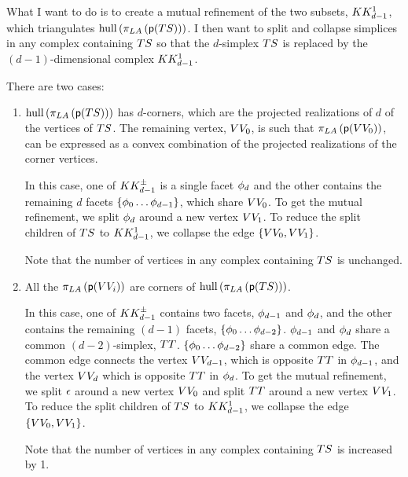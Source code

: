 What I want to do is to create a mutual refinement of the two subsets,
$K{K}_{d-1}^{1}$,
which triangulates
$\mathrm{hull} \left( \pi_{L{A}} \left( \mathsf{p} ( T{S} ) \right) \right)$.
I then want to split and collapse simplices in any complex containing $T{S}$
so that the $d$-simplex $T{S}$ is replaced by the $(d-1)$-dimensional
complex $K{K}_{d-1}^{1}$.

There are two cases:
\begin{enumerate}

\item $\mathrm{hull} \left( \pi_{L{A}} \left( \mathsf{p} ( T{S} ) \right) \right)$
has $d$-corners, which are the projected realizations of $d$
of the vertices of $T{S}$.
The remaining vertex, $V{V}_0$,
is such that
$\pi_{L{A}} \left( \mathsf{p} ( V{V}_0 ) \right)$,
can be expressed
as a convex combination of the projected realizations of the corner vertices.

In this case, one of $K{K}_{d-1}^{\pm}$ is a single facet $\phi_d$
and the other contains the remaining $d$ facets $\{\phi_0 \ldots \phi_{d-1} \}$,
which share $V{V}_0$.
To get the mutual refinement, we split $\phi_d$ around a new vertex $V{V}_1$.
To reduce the split children of $T{S}$ to $K{K}_{d-1}^{1}$,
we collapse the edge $\{ V{V}_0 , V{V}_1 \}$.

Note that the number of vertices in any complex containing $T{S}$
is unchanged.

\item All the $\pi_{L{A}} \left( \mathsf{p} ( V{V}_i ) \right) $
are corners of
$\mathrm{hull} \left( \pi_{L{A}} \left( \mathsf{p} ( T{S} ) \right) \right)$.

In this case, one of $K{K}_{d-1}^{\pm}$
contains two facets, $\phi_{d-1}$ and $\phi_{d}$,
and the other contains the remaining $(d-1)$ facets, $\{\phi_0 \ldots \phi_{d-2} \}$.
$\phi_{d-1}$ and $\phi_{d}$ share a common $(d-2)$-simplex, $T{T}$.
$\{\phi_0 \ldots \phi_{d-2} \}$ share a common edge.
The common edge connects the vertex $V{V}_{d-1}$,
which is opposite $T{T}$ in $\phi_{d-1}$,
and the vertex $V{V}_{d}$
which is opposite $T{T}$ in $\phi_{d}$.
To get the mutual refinement, we split $\epsilon$ around a new vertex $V{V}_0$
and split $T{T}$ around a new vertex $V{V}_1$.
To reduce the split children of $T{S}$ to $K{K}_{d-1}^{1}$,
we collapse the edge $\{ V{V}_0 , V{V}_1 \}$.

Note that the number of vertices in any complex containing $T{S}$
is increased by 1.

\end{enumerate}








